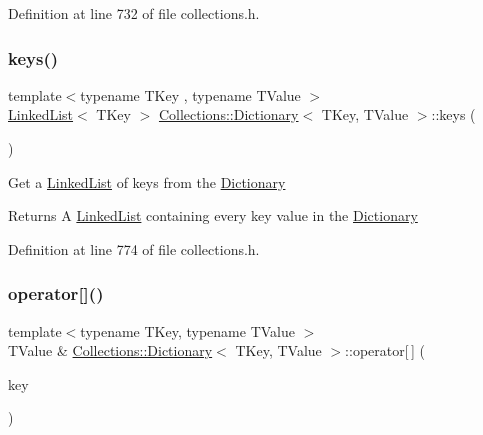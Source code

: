 Definition at line 732 of file collections.\+h.

\hypertarget{class_collections_1_1_dictionary_a2c8e857e82c6cf00f36a745e48b69722}{}\label{class_collections_1_1_dictionary_a2c8e857e82c6cf00f36a745e48b69722} 
\subsubsection{\texorpdfstring{keys()}{keys()}}
{\footnotesize\ttfamily template$<$typename T\+Key , typename T\+Value $>$ \\
\hyperlink{class_collections_1_1_linked_list}{Linked\+List}$<$ T\+Key $>$ \hyperlink{class_collections_1_1_dictionary}{Collections\+::\+Dictionary}$<$ T\+Key, T\+Value $>$\+::keys (\begin{DoxyParamCaption}{ }\end{DoxyParamCaption})}

Get a \hyperlink{class_collections_1_1_linked_list}{Linked\+List} of keys from the \hyperlink{class_collections_1_1_dictionary}{Dictionary} \begin{DoxyReturn}{Returns}
A \hyperlink{class_collections_1_1_linked_list}{Linked\+List} containing every key value in the \hyperlink{class_collections_1_1_dictionary}{Dictionary} 
\end{DoxyReturn}


Definition at line 774 of file collections.\+h.

\hypertarget{class_collections_1_1_dictionary_af1902b74664715fc19fd2d8944f2d65c}{}\label{class_collections_1_1_dictionary_af1902b74664715fc19fd2d8944f2d65c} 
\subsubsection{\texorpdfstring{operator[]()}{operator[]()}\hspace{0.1cm}{\footnotesize\ttfamily [1/2]}}
{\footnotesize\ttfamily template$<$typename T\+Key, typename T\+Value $>$ \\
T\+Value \& \hyperlink{class_collections_1_1_dictionary}{Collections\+::\+Dictionary}$<$ T\+Key, T\+Value $>$\+::operator\mbox{[}$\,$\mbox{]} (\begin{DoxyParamCaption}\item[{T\+Key}]{key }\end{DoxyParamCaption})}

